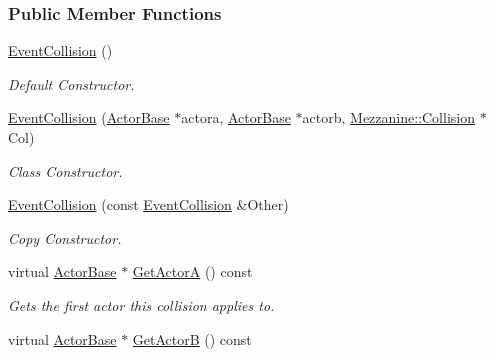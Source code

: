\subsubsection*{Public Member Functions}
\begin{DoxyCompactItemize}
\item 
\hypertarget{classMezzanine_1_1EventCollision_ae0813b544c1df94159e364b3a5720a6a}{
\hyperlink{classMezzanine_1_1EventCollision_ae0813b544c1df94159e364b3a5720a6a}{EventCollision} ()}
\label{classMezzanine_1_1EventCollision_ae0813b544c1df94159e364b3a5720a6a}

\begin{DoxyCompactList}\small\item\em Default Constructor. \item\end{DoxyCompactList}\item 
\hyperlink{classMezzanine_1_1EventCollision_affa8e2d9f0d20d33e8131fa05348879c}{EventCollision} (\hyperlink{classMezzanine_1_1ActorBase}{ActorBase} $\ast$actora, \hyperlink{classMezzanine_1_1ActorBase}{ActorBase} $\ast$actorb, \hyperlink{classMezzanine_1_1Collision}{Mezzanine::Collision} $\ast$Col)
\begin{DoxyCompactList}\small\item\em Class Constructor. \item\end{DoxyCompactList}\item 
\hyperlink{classMezzanine_1_1EventCollision_ae6917514b805e00607ce88ae01f52780}{EventCollision} (const \hyperlink{classMezzanine_1_1EventCollision}{EventCollision} \&Other)
\begin{DoxyCompactList}\small\item\em Copy Constructor. \item\end{DoxyCompactList}\item 
virtual \hyperlink{classMezzanine_1_1ActorBase}{ActorBase} $\ast$ \hyperlink{classMezzanine_1_1EventCollision_adb7943576f8033703f0afcbce43f56cc}{GetActorA} () const 
\begin{DoxyCompactList}\small\item\em Gets the first actor this collision applies to. \item\end{DoxyCompactList}\item 
virtual \hyperlink{classMezzanine_1_1ActorBase}{ActorBase} $\ast$ \hyperlink{classMezzanine_1_1EventCollision_ad3d7b44e680425d33bb2556de4d9a056}{GetActorB} () const 

\end{DoxyCompactItemize}
